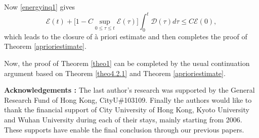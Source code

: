 \documentclass{amsart}[12pt, article]
\begin{document}
Now \eqref{energyinq1} gives
\begin{equation*}\label{ineq1}
\mathcal{E}(t)+\Big[1-C\sup_{0\le \tau\le t}\mathcal{E}(\tau)\Big]
\int_0^t\mathcal{D}(\tau)d\tau\le C\mathcal{E}(0),
\end{equation*}
which leads to the closure of \`a priori estimate
and then completes the proof of Theorem \ref{aprioriestimate}.

Now, the proof of Theorem \ref{theo1}
can be completed by the usual continuation argument based on Theorem \ref{theo4.2.1} and Theorem \ref{aprioriestimate}.

\bigskip
\noindent
{\bf Acknowledgements :}
The last author's research was supported by the General Research
Fund of Hong Kong, CityU\#103109. Finally the authors would like to
thank the financial support of City University of Hong Kong, Kyoto
University and Wuhan University during each of their stays, mainly starting {}from 2006. These supports have enable the final conclusion through our previous papers.

\vskip0.5cm

\
\end{document}

